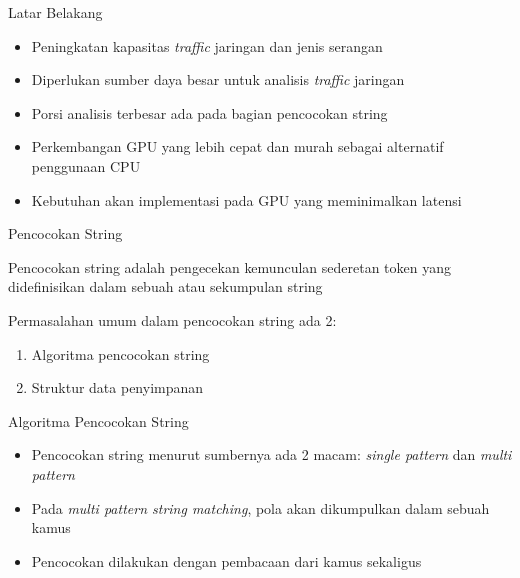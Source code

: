 \documentclass[10pt]{beamer}
\begin{document}
\begin{frame}[fragile]{Latar Belakang}
    \begin{itemize}

        \item Peningkatan kapasitas \emph{traffic} jaringan dan jenis serangan

        \item Diperlukan sumber daya besar untuk analisis \emph{traffic} jaringan

        \item Porsi analisis terbesar ada pada bagian pencocokan string

        \item Perkembangan GPU yang lebih cepat dan murah sebagai alternatif 
        penggunaan CPU
        \item Kebutuhan akan implementasi pada GPU yang meminimalkan latensi

    \end{itemize}
\end{frame}

\begin{frame}[fragile]{Pencocokan String}

    Pencocokan string adalah pengecekan kemunculan sederetan token yang didefinisikan dalam sebuah atau sekumpulan string
    
    Permasalahan umum dalam pencocokan string ada 2:
    \begin{enumerate}
    
        \item Algoritma pencocokan string
    
        \item Struktur data penyimpanan
    
    \end{enumerate}
\end{frame}

\begin{frame}[fragile]{Algoritma Pencocokan String}
    \begin{itemize}

        \item Pencocokan string menurut sumbernya ada 2 macam: \emph{single pattern} dan \emph{multi pattern}

        \item Pada \emph{multi pattern string matching}, pola akan dikumpulkan dalam sebuah kamus
    
        \item Pencocokan dilakukan dengan pembacaan dari kamus sekaligus

    \end{itemize}
\end{frame}
\end{document}
